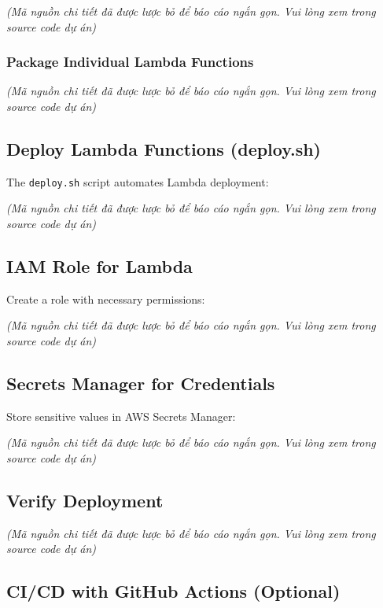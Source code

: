 \emph{(Mã nguồn chi tiết đã được lược bỏ để báo cáo ngắn gọn. Vui lòng
xem trong source code dự án)}

\hypertarget{package-individual-lambda-functions}{%
\subsubsection{Package Individual Lambda
Functions}}

\emph{(Mã nguồn chi tiết đã được lược bỏ để báo cáo ngắn gọn. Vui lòng
xem trong source code dự án)}

\hypertarget{deploy-lambda-functions-deploy.sh}{%
\subsection{Deploy Lambda Functions
(deploy.sh)}}

The \texttt{deploy.sh} script automates Lambda deployment:

\emph{(Mã nguồn chi tiết đã được lược bỏ để báo cáo ngắn gọn. Vui lòng
xem trong source code dự án)}

\hypertarget{iam-role-for-lambda}{%
\subsection{IAM Role for Lambda}}

Create a role with necessary permissions:

\emph{(Mã nguồn chi tiết đã được lược bỏ để báo cáo ngắn gọn. Vui lòng
xem trong source code dự án)}

\hypertarget{secrets-manager-for-credentials}{%
\subsection{Secrets Manager for
Credentials}}

Store sensitive values in AWS Secrets Manager:

\emph{(Mã nguồn chi tiết đã được lược bỏ để báo cáo ngắn gọn. Vui lòng
xem trong source code dự án)}

\hypertarget{verify-deployment}{%
\subsection{Verify Deployment}}

\emph{(Mã nguồn chi tiết đã được lược bỏ để báo cáo ngắn gọn. Vui lòng
xem trong source code dự án)}

\hypertarget{cicd-with-github-actions-optional}{%
\subsection{CI/CD with GitHub Actions
(Optional)}}

